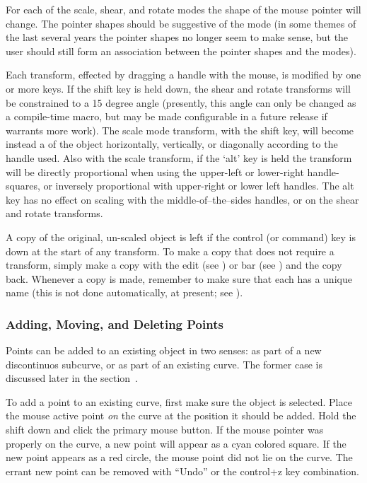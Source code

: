 			For each of the
			scale, shear, and rotate modes the shape of the
			mouse pointer will change. The pointer shapes
			should be suggestive of the mode (in some
			 themes of the last several years the
			pointer shapes no longer seem to make sense, but the
			user should still form an association between the
			pointer shapes and the modes).
			
			Each transform, effected by dragging a handle with the
			mouse, is modified by one or more keys.	If the shift
			key is held down, the shear and rotate transforms
			will be constrained to a 15 degree angle (presently,
			this angle can only be changed as a compile-time
			macro, but may be made configurable
			in a future release if \IXpkg{} warrants more work).
			The scale mode transform, with the shift key, will become
			instead a  of the object horizontally,
			vertically, or diagonally according to the handle
			used. Also with the scale transform, if the `alt'
			key is held the transform will be directly proportional
			when using the upper-left or lower-right handle-squares,
			or inversely proportional with upper-right or
			lower left handles. The alt key has no effect on
			scaling with the middle-of--the--sides handles, or on
			the shear and rotate transforms.
			
			A copy of the original, un-scaled object is left
			if the control (or command) key is down
			at the start of any transform. To make a copy that
			does not require a transform, simply make a
			 copy with the edit 
			(see ) or  bar
			(see ) and
			 the copy back. Whenever a copy is
			made, remember to make sure that each has a unique
			name (this is not done automatically, at present;
			see ).
			
			\subsubsection{Adding, Moving, and Deleting Points}%
			\label{sssec:add_del_points}
			Points can be added to an existing object in two
			senses: as part of a new discontinuos subcurve, or as
			part of an existing curve. The former case is
			discussed later in the
			section~.
			
			To add a point to an existing curve, first make sure
			the object is selected. Place the mouse active point
			\emph{on} the curve at the position it should be added.
			Hold the shift  down and click the
			primary mouse button. If the mouse pointer was
			properly on the curve, a new point will appear as a
			cyan colored square. If the new point appears as
			a red circle, the mouse point did not lie on the
			curve. The errant new point can be removed with
			``Undo'' or the control+z key combination.
			
